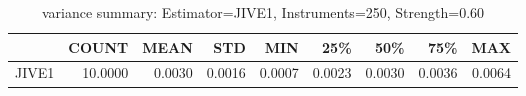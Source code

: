 \begin{table}[ht]
\centering
\caption{variance summary: Estimator=JIVE1, Instruments=250, Strength=0.60}
\begin{tabular}{lrrrrrrrr}
\toprule
 & COUNT & MEAN & STD & MIN & 25\% & 50\% & 75\% & MAX \\
\midrule
JIVE1 & 10.0000 & 0.0030 & 0.0016 & 0.0007 & 0.0023 & 0.0030 & 0.0036 & 0.0064 \\
\bottomrule
\end{tabular}
\end{table}
